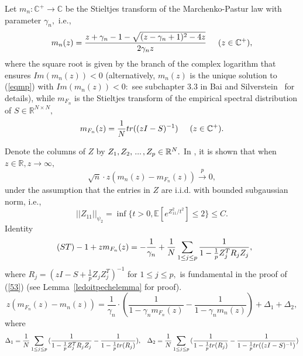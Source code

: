 \documentclass{article}
\numberwithin{equation}{section}
\begin{document}
Let \(m_n:\mathbb{C}^{+} \to \mathbb{C}\) %
be the Stieltjes transform of the Marchenko-Pastur law with parameter \(\gamma_n,\) i.e.,
\[m_n(z)=\frac{z+\gamma_n-1-\sqrt{(z-\gamma_n+1)^2-4z}}{2\gamma_n z} \hspace{0.5cm} (z \in \mathbb{C}^+),\]
where the square root is given by the branch of the complex logarithm that ensures \(Im(m_n(z))<0\) (alternatively, \(m_n(z)\) is the unique solution to (\ref{eqmp}) with \(Im(m_n(z))<0:\) see subchapter \(3.3\) in Bai and Silverstein~\cite{baisilvbook} for details), while \(m_{F_n}\) is the Stieltjes transform of the empirical spectral distribution of \(S \in \mathbb{R}^{N \times N},\)
\[m_{F_n}(z)=\frac{1}{N}tr((zI-S)^{-1}) \hspace{0.5cm} (z \in \mathbb{C}^+).\]
\par
Denote the columns of \(Z\) by \(Z_1,Z_2, \hspace{0.05cm} ... \hspace{0.05cm}, Z_{p} \in \mathbb{R}^{N}.\) In \cite{oldpaper}, it is shown that when \(z \in \mathbb{R}, z \to \infty,\)
\begin{equation}\label{53}
    \sqrt{n} \cdot z(m_n(z)-m_{F_n}(z)) \xrightarrow[]{p} 0,
\end{equation}
under the assumption that the entries in \(Z\) are i.i.d. with bounded subgaussian norm, i.e.,
\[||Z_{11}||_{\psi_2}=\inf{\{t>0, \mathbb{E}[e^{Z_{11}^2/t^2}] \leq 2\}} \leq C.\]
Identity
\begin{equation}\tag{\(ST\)}\label{554}
    -1+zm_{F_n}(z)=-\frac{1}{\gamma_n}
    +\frac{1}{N}\sum_{1 \leq j \leq p}{\frac{1}{1-\frac{1}{p}Z_j^TR_jZ_j}} ,\hspace{0.5cm}
\end{equation}
where \(R_j=(zI-S+\frac{1}{p}Z_jZ_j^T)^{-1}\) for \(1 \leq j \leq p,\) is fundamental in the proof of (\ref{53}) (see Lemma~\ref{ledoitpechelemma} for proof). %
\begin{equation}\label{zeq}
    z(m_{F_n}(z)-m_n(z))=\frac{1}{\gamma_n} \cdot (\frac{1}{1-\gamma_n m_{F_n}(z)}-\frac{1}{1-\gamma_n m_n(z)})+\Delta_1+\Delta_2,
\end{equation}
where
\[\Delta_1=\frac{1}{N}\sum_{1 \leq j \leq p}{(\frac{1}{1-\frac{1}{p}Z_j^TR_jZ_j}-\frac{1}{1-\frac{1}{p}tr(R_j)})}, \hspace{0.3cm} \Delta_2=\frac{1}{N}\sum_{1 \leq j \leq p}{(\frac{1}{1-\frac{1}{p}tr(R_j)}-\frac{1}{1-\frac{1}{p}tr((zI-S)^{-1})})}\]
\end{document}
